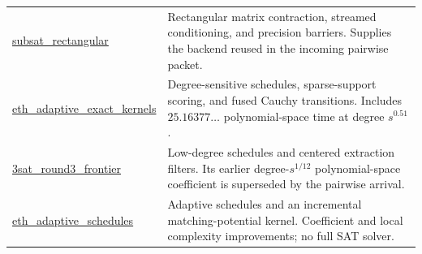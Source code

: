 \begin{longtable}{>{\raggedright\arraybackslash}p{4.9cm}>{\raggedright\arraybackslash}p{10cm}}
\href{https://github.com/VladimirReshetnikov/ProveIt/tree/8e76d515063c4b9fbd8743a846b457e3a01bc039/Computability/SubexponentialSAT/Research/subsat_rectangular}{\textsf{subsat\_\allowbreak rectangular}} & Rectangular matrix contraction, streamed conditioning, and precision barriers. Supplies the backend reused in the incoming pairwise packet.\\[3pt]
\href{https://github.com/VladimirReshetnikov/ProveIt/tree/8e76d515063c4b9fbd8743a846b457e3a01bc039/Computability/SubexponentialSAT/Research/eth_adaptive_exact_kernels}{\textsf{eth\_\allowbreak adaptive\_\allowbreak exact\_\allowbreak kernels}} & Degree-sensitive schedules, sparse-support scoring, and fused Cauchy transitions. Includes $25.16377\ldots$ polynomial-space time at degree $s^{0.51}$.\\[3pt]
\href{https://github.com/VladimirReshetnikov/ProveIt/tree/8e76d515063c4b9fbd8743a846b457e3a01bc039/Computability/SubexponentialSAT/Research/3sat_round3_frontier}{\textsf{3sat\_\allowbreak round3\_\allowbreak frontier}} & Low-degree schedules and centered extraction filters. Its earlier degree-$s^{1/12}$ polynomial-space coefficient is superseded by the pairwise arrival.\\[3pt]
\href{https://github.com/VladimirReshetnikov/ProveIt/tree/8e76d515063c4b9fbd8743a846b457e3a01bc039/Computability/SubexponentialSAT/Research/eth_adaptive_schedules}{\textsf{eth\_\allowbreak adaptive\_\allowbreak schedules}} & Adaptive schedules and an incremental matching-potential kernel. Coefficient and local complexity improvements; no full SAT solver.\\[3pt]
\end{longtable}

